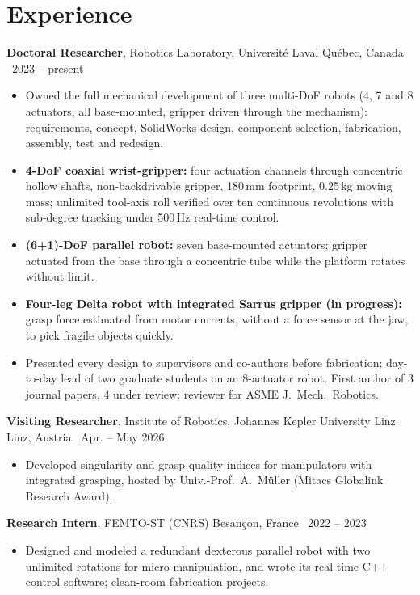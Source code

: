 \documentclass[10pt,a4paper]{article}
\newcommand{\role}[4]{\textbf{#1}, #2 \hfill {\color{muted}#3 \textbar\ #4}\par}
\begin{document}
\section{Experience}
\role{Doctoral Researcher}{Robotics Laboratory, Universit\'e Laval}{Qu\'ebec, Canada}{2023 -- present}
\begin{itemize}
\item Owned the full mechanical development of three multi-DoF robots (4, 7 and 8 actuators, all base-mounted, gripper
driven through the mechanism): requirements, concept, SolidWorks design, component selection, fabrication, assembly,
test and redesign.
\item \textbf{4-DoF coaxial wrist-gripper:} four actuation channels through concentric hollow shafts, non-backdrivable
gripper, 180\,mm footprint, 0.25\,kg moving mass; unlimited tool-axis roll verified over ten continuous revolutions with
sub-degree tracking under 500\,Hz real-time control.
\item \textbf{(6+1)-DoF parallel robot:} seven base-mounted actuators; gripper actuated from the base through a
concentric tube while the platform rotates without limit.
\item \textbf{Four-leg Delta robot with integrated Sarrus gripper (in progress):} grasp force estimated from motor
currents, without a force sensor at the jaw, to pick fragile objects quickly.
\item Presented every design to supervisors and co-authors before fabrication; day-to-day lead of two graduate students
on an 8-actuator robot. First author of 3 journal papers, 4 under review; reviewer for ASME J.\ Mech.\ Robotics.
\end{itemize}

\vspace{3pt}
\role{Visiting Researcher}{Institute of Robotics, Johannes Kepler University Linz}{Linz, Austria}{Apr. -- May 2026}
\begin{itemize}
\item Developed singularity and grasp-quality indices for manipulators with integrated grasping, hosted by Univ.-Prof.~A.~M\"uller (Mitacs Globalink Research Award).
\end{itemize}

\vspace{3pt}
\role{Research Intern}{FEMTO-ST (CNRS)}{Besan\c{c}on, France}{2022 -- 2023}
\begin{itemize}
\item Designed and modeled a redundant dexterous parallel robot with two unlimited rotations for micro-manipulation, and wrote its real-time C++ control software; clean-room fabrication projects.
\end{itemize}
\end{document}
